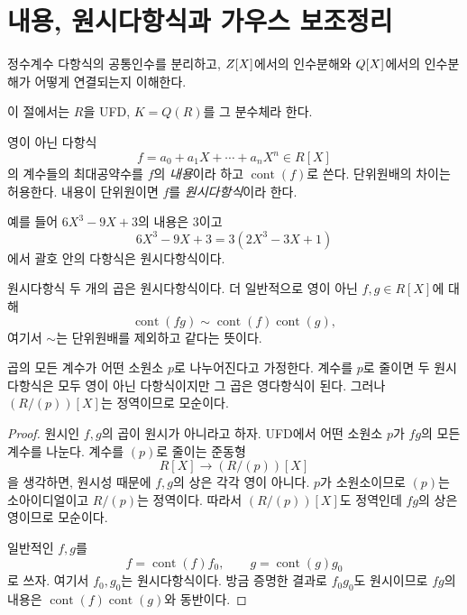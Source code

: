 \section{내용, 원시다항식과 가우스 보조정리}
\label{sec:gauss-lemma}

\begin{learninggoal}
정수계수 다항식의 공통인수를 분리하고, $Z[X]$에서의 인수분해와 $Q[X]$에서의 인수분해가 어떻게 연결되는지 이해한다.
\end{learninggoal}

이 절에서는 $R$을 UFD, $K=Q(R)$를 그 분수체라 한다.

\begin{definition}
영이 아닌 다항식
\[
  f=a_0+a_1X+\cdots+a_nX^n\in R[X]
\]
의 계수들의 최대공약수를 $f$의 \emph{내용}이라 하고 $\operatorname{cont}(f)$로 쓴다. 단위원배의 차이는 허용한다. 내용이 단위원이면 $f$를 \emph{원시다항식}이라 한다.
\end{definition}

예를 들어 $6X^3-9X+3$의 내용은 $3$이고
\[
  6X^3-9X+3=3(2X^3-3X+1)
\]
에서 괄호 안의 다항식은 원시다항식이다.

\begin{lemma}
원시다항식 두 개의 곱은 원시다항식이다. 더 일반적으로 영이 아닌 $f,g\in R[X]$에 대해
\[
  \operatorname{cont}(fg)\sim
  \operatorname{cont}(f)\operatorname{cont}(g),
\]
여기서 $\sim$는 단위원배를 제외하고 같다는 뜻이다.
\end{lemma}

\begin{proofidea}
곱의 모든 계수가 어떤 소원소 $p$로 나누어진다고 가정한다. 계수를 $p$로 줄이면 두 원시다항식은 모두 영이 아닌 다항식이지만 그 곱은 영다항식이 된다. 그러나 $(R/(p))[X]$는 정역이므로 모순이다.
\end{proofidea}

\begin{proof}
원시인 $f,g$의 곱이 원시가 아니라고 하자. UFD에서 어떤 소원소 $p$가 $fg$의 모든 계수를 나눈다. 계수를 $(p)$로 줄이는 준동형
\[
  R[X]\to(R/(p))[X]
\]
을 생각하면, 원시성 때문에 $f,g$의 상은 각각 영이 아니다. $p$가 소원소이므로 $(p)$는 소아이디얼이고 $R/(p)$는 정역이다. 따라서 $(R/(p))[X]$도 정역인데 $fg$의 상은 영이므로 모순이다.

일반적인 $f,g$를
\[
  f=\operatorname{cont}(f)f_0,
  \qquad
  g=\operatorname{cont}(g)g_0
\]
로 쓰자. 여기서 $f_0,g_0$는 원시다항식이다. 방금 증명한 결과로 $f_0g_0$도 원시이므로 $fg$의 내용은 $\operatorname{cont}(f)\operatorname{cont}(g)$와 동반이다.
\end{proof}

